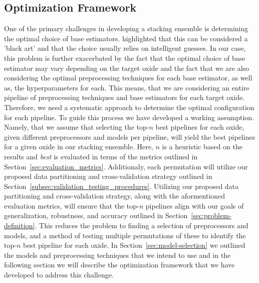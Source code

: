 \subsection{Optimization Framework}\label{sec:optimization-framework}
One of the primary challenges in developing a stacking ensemble is determining the optimal choice of base estimators.
\citet{wolpert1992stacked} highlighted that this can be considered a 'black art' and that the choice usually relies on intelligent guesses.
In our case, this problem is further exacerbated by the fact that the optimal choice of base estimator may vary depending on the target oxide and the fact that we are also considering the optimal preprocessing techniques for each base estimator, as well as, the hyperparameters for each.
This means, that we are considering an entire pipeline of preprocessing techniques and base estimators for each target oxide.
Therefore, we need a systematic approach to determine the optimal configuration for each pipeline.
To guide this process we have developed a working assumption.
Namely, that we assume that selecting the top-$n$ best pipelines for each oxide, given different preprocessors and models per pipeline, will yield the best pipelines for a given oxide in our stacking ensemble.
Here, $n$ is a heuristic based on the results and \textit{best} is evaluated in terms of the metrics outlined in Section~\ref{sec:evaluation_metrics}.
Additionaly, each permutation will utilize our proposed data partitioning and cross-validation strategy outlined in Section~\ref{subsec:validation_testing_procedures}.
Utilizing our proposed data partitioning and cross-validation strategy, along with the aformentioned evaluation metrics, will ensure that the top-$n$ pipelines align with our goals of generalization, robustness, and accuracy outlined in Section~\ref{sec:problem-definition}.
This reduces the problem to finding a selection of preprocessors and models, and a method of testing multiple permutations of these to identify the top-$n$ best pipeline for each oxide.
In Section~\ref{sec:model-selection} we outlined the models and preprocessing techniques that we intend to use and in the following section we will describe the optimization framework that we have developed to address this challenge.

